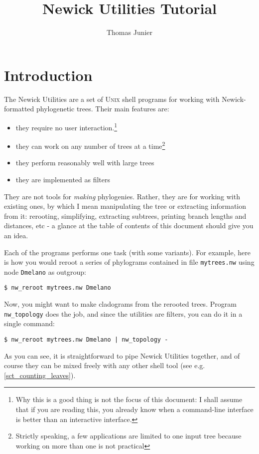 \documentclass[a4paper,10pt]{report}
\title{Newick Utilities Tutorial}
\author{Thomas Junier}
\newcommand{\nutils}{Newick Utilities}
\newcommand{\unix}{\textsc{Unix}}
\newcommand{\topology}{\texttt{nw\_topology}}
\theoremstyle{definition}
\begin{document}
\maketitle
\tableofcontents

\chapter{Introduction}

The \nutils{} are a set of \unix{} shell programs for working with Newick-formatted phylogenetic trees. Their main features are:
\begin{itemize}
 \item they require no user interaction.\footnote{Why this is a good thing is not the focus of this document: I shall assume that if you are reading this, you already know when a command-line interface is better than an interactive interface.}
 \item they can work on any number of trees at a time\footnote{Strictly speaking, a few applications are limited to one input tree because working on more than one is not practical}
 \item they perform reasonably well with large trees
 \item they are implemented as filters
\end{itemize}
They are not tools for \emph{making} phylogenies. Rather, they are for working with existing ones, by which I mean manipulating the tree or extracting information from it: rerooting, simplifying, extracting subtrees, printing branch lengths and distances, etc - a glance at the table of contents of this document should give you an idea.

Each of the programs performs one task (with some variants). For example, here is how you would reroot a series of phylograms contained in file \texttt{mytrees.nw} using node \texttt{Dmelano} as outgroup:

\begin{verbatim}
$ nw_reroot mytrees.nw Dmelano
\end{verbatim} 
Now, you might want to make cladograms from the rerooted trees. Program \topology{} does the job, and since the utilities are filters, you can do it in a single command:
\begin{verbatim}
$ nw_reroot mytrees.nw Dmelano | nw_topology -
\end{verbatim}
As you can see, it is straightforward to pipe \nutils{} together, and of course they can be mixed freely with any other shell tool (see e.g. \ref{sct_counting_leaves}).
\end{document}
